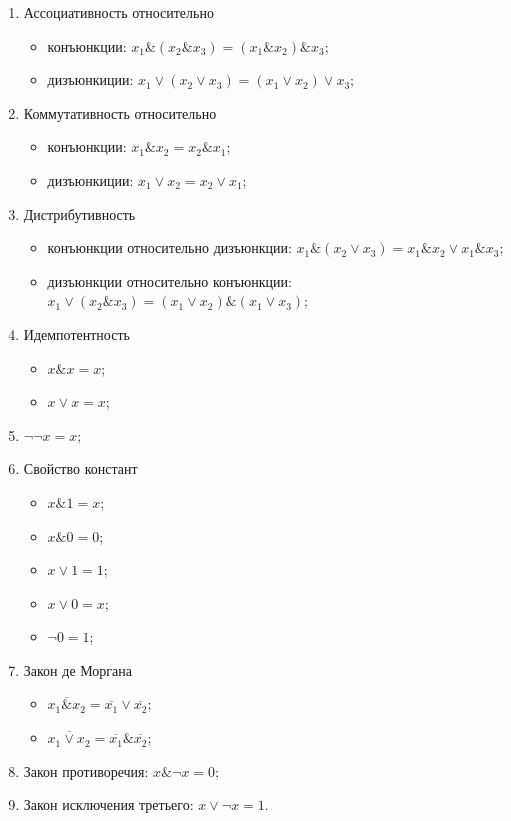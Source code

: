 \documentclass[a4paper,12pt]{report}
\begin{document}
	\begin{enumerate}
		\item Ассоциативность относительно
			\begin{itemize}
				\item конъюнкции: $x_1 \& (x_2 \& x_3) = (x_1 \& x_2) \& x_3$;
				\item дизъюнкиции: $x_1 \vee (x_2 \vee x_3) = (x_1 \vee x_2) \vee x_3$;
			\end{itemize}
		\item Коммутативность относительно
			\begin{itemize}
				\item конъюнкции: $x_1 \& x_2 = x_2 \& x_1$;
				\item дизъюнкиции: $x_1 \vee x_2 = x_2 \vee x_1$;
			\end{itemize}
		\item Дистрибутивность
			\begin{itemize}
				\item конъюнкции относительно дизъюнкции: $x_1 \& (x_2 \vee x_3)
					= x_1 \& x_2 \vee x_1 \& x_3$;
				\item дизъюнкции относительно конъюнкции: $x_1 \vee (x_2 \& x_3)
					= (x_1 \vee x_2) \& (x_1 \vee x_3)$;
			\end{itemize}
		\item Идемпотентность
			\begin{itemize}
				\item $x \& x = x$;
				\item $x \vee x = x$;
			\end{itemize}
		\item $\neg \neg x = x$;
		\item Свойство констант
			\begin{itemize}
				\item $x \& 1 = x$;
				\item $x \& 0 = 0$;
				\item $x \vee 1 = 1$;
				\item $x \vee 0 = x$;
				\item $\neg 0 = 1$;
			\end{itemize}
		\item Закон де Моргана
			\begin{itemize}
				\item $\overline{x_1 \& x_2} = \overline{x_1} \vee \overline{x_2}$;
				\item $\overline{x_1 \vee x_2} = \overline{x_1}\& \overline{x_2}$;
			\end{itemize}
		\item Закон противоречия: $x \& \neg x = 0$;
		\item Закон исключения третьего: $x \vee \neg x = 1$.
	\end{enumerate}
\end{document}
